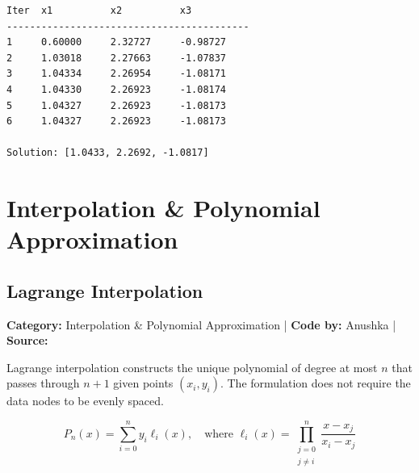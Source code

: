 \documentclass[10pt,a4paper]{report}
\begin{document}
\begin{tcolorbox}[colback=termbg,colframe=primary,title=\textbf{Program Execution Output \& Convergence Table},boxrule=1pt,arc=2mm]
\begin{lstlisting}[style=terminal_output]
Iter  x1          x2          x3          
------------------------------------------
1     0.60000     2.32727     -0.98727    
2     1.03018     2.27663     -1.07837    
3     1.04334     2.26954     -1.08171    
4     1.04330     2.26923     -1.08174    
5     1.04327     2.26923     -1.08173    
6     1.04327     2.26923     -1.08173    

Solution: [1.0433, 2.2692, -1.0817]
\end{lstlisting}
\end{tcolorbox}

\newpage

\chapter{Interpolation \& Polynomial Approximation}

\section{Lagrange Interpolation}
\textbf{Category:} \textcolor{secondary}{Interpolation \& Polynomial Approximation} \quad | \quad \textbf{Code by:} \textcolor{secondary}{Anushka} \quad | \quad \textbf{Source:} \texttt{}

Lagrange interpolation constructs the unique polynomial of degree at most $n$ that passes through $n+1$ given points $(x_i, y_i)$. The formulation does not require the data nodes to be evenly spaced.

\begin{tcolorbox}[colback=theorybg,colframe=theoryframe,title=\textbf{Mathematical Theory \& Formulation},boxrule=1pt,arc=2mm]
\[
P_n(x) = \sum_{i=0}^n y_i \ell_i(x), \quad \text{where } \ell_i(x) = \prod_{\substack{j=0 \\ j \neq i}}^n \frac{x - x_j}{x_i - x_j}
\]
\end{tcolorbox}
\end{document}
